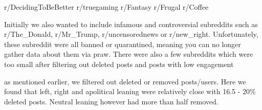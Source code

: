 r/DecidingToBeBetter
r/truegaming
r/Fantasy
r/Frugal
r/Coffee

Initially we also wanted to include infamous and controversial subreddits such as r/The\_Donald, r/Mr\_Trump, r/uncensorednews or r/new\_right. Unfortunately, these subreddit were all banned or quarantined, meaning you can no longer gather data about them via praw.
There were also a few subreddits which were too small after filtering out deleted posts and posts with low engagement



as mentioned earlier, we filtered out deleted or removed posts/users. Here we found that left, right and apolitical leaning were relatively close with 16.5 - 20\% deleted posts. Neutral leaning however had more than half removed. 


